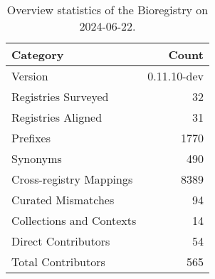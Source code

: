 \begin{table}
\caption{Overview statistics of the Bioregistry on 2024-06-22.}
\label{tab:bioregistry-summary}
\begin{tabular}{lr}
\toprule
Category & Count \\
\midrule
Version & 0.11.10-dev \\
Registries Surveyed & 32 \\
Registries Aligned & 31 \\
Prefixes & 1770 \\
Synonyms & 490 \\
Cross-registry Mappings & 8389 \\
Curated Mismatches & 94 \\
Collections and Contexts & 14 \\
Direct Contributors & 54 \\
Total Contributors & 565 \\
\bottomrule
\end{tabular}
\end{table}
